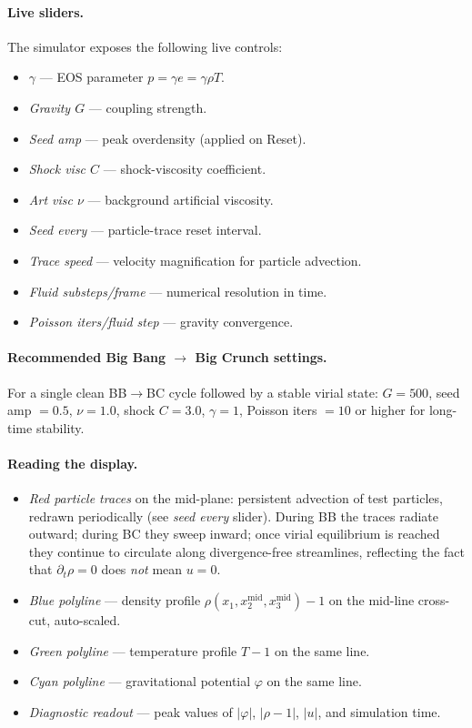 \paragraph{Live sliders.}
The simulator exposes the following live controls:
\begin{itemize}
\item \emph{$\gamma$} --- EOS parameter $p = \gamma e = \gamma\rho T$.
\item \emph{Gravity $G$} --- coupling strength.
\item \emph{Seed amp} --- peak overdensity (applied on Reset).
\item \emph{Shock visc $C$} --- shock-viscosity coefficient.
\item \emph{Art visc $\nu$} --- background artificial viscosity.
\item \emph{Seed every} --- particle-trace reset interval.
\item \emph{Trace speed} --- velocity magnification for particle advection.
\item \emph{Fluid substeps/frame} --- numerical resolution in time.
\item \emph{Poisson iters/fluid step} --- gravity convergence.
\end{itemize}

\paragraph{Recommended Big Bang $\to$ Big Crunch settings.}
For a single clean BB$\to$BC cycle followed by a stable virial state:
$G = 500$, seed amp $= 0.5$, $\nu = 1.0$, shock $C = 3.0$, $\gamma = 1$,
Poisson iters $= 10$ or higher for long-time stability.

\paragraph{Reading the display.}
\begin{itemize}
\item \emph{Red particle traces} on the mid-plane: persistent advection
of test particles, redrawn periodically (see \emph{seed every} slider).
During BB the traces radiate outward; during BC they sweep inward;
once virial equilibrium is reached they continue to circulate along
divergence-free streamlines, reflecting the fact that
$\partial_t\rho = 0$ does \emph{not} mean $u = 0$.
\item \emph{Blue polyline} --- density profile $\rho(x_1, x_2^{\mathrm{mid}}, x_3^{\mathrm{mid}})-1$ on the mid-line cross-cut, auto-scaled.
\item \emph{Green polyline} --- temperature profile $T-1$ on the same line.
\item \emph{Cyan polyline} --- gravitational potential $\varphi$ on the same line.
\item \emph{Diagnostic readout} --- peak values of $|\varphi|$, $|\rho-1|$, $|u|$, and simulation time.
\end{itemize}

